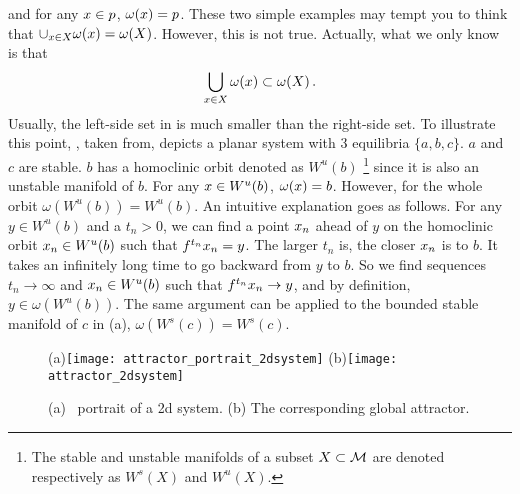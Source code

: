 and for any $x\in p$, $\omega(x) = p$.
These two simple examples may tempt you to
think that $\cup_{x\in X}\omega(x) = \omega(X)$. However, this
is not true. Actually, what we only know is that
\begin{equation}
  \label{eq:omega3}
  \bigcup_{x\in X}\omega(x)\subset \omega(X)
  \,.
\end{equation}
Usually, the left-side set in  is much smaller than
the right-side set. To illustrate this point,
, taken from, depicts a planar system
with 3 equilibria $\{a, b, c\}$. $a$ and $c$ are stable.
$b$ has a homoclinic orbit denoted as $W^u(b)$
\footnote{
  The stable and unstable manifolds of a subset $X\subset \mathcal{M}$ are denoted respectively
  as $W^s(X)$ and $W^u(X)$.
}
since it is
also an unstable manifold of $b$. For any $x\in W^u(b)$,
$\omega(x) = b$. However, for the whole orbit
$\omega(W^u(b)) = W^u(b)$. An intuitive explanation goes as follows.
For any $y\in W^u(b)$ and a $t_n > 0$, we can find a point $x_n$
ahead of $y$ on the homoclinic orbit $x_n\in W^u(b)$
such that ${f^{t_n}}x_n = y$. The larger $t_n$ is, the closer $x_n$ is to $b$.
It takes an infinitely long time to go backward from $y$ to $b$.
So we find sequences $t_n\to \infty$ and $x_n \in W^u(b)$ such that
${f^{t_n}}x_n \to y$, and by definition, $y\in \omega(W^u(b))$.
The same argument can be applied
to the bounded stable manifold of $c$ in (a),
$\omega(W^s(c)) = W^s(c)$.
\begin{figure}[h]
  \centering
  (a)\texttt{[image: attractor\_portrait\_2dsystem]}
  (b)\texttt{[image: attractor\_2dsystem]}
  \caption[The global attractor of a 2d system]{
    (a) \Statesp\ portrait of a 2d system.
    (b) The corresponding global attractor.
  }
  \label{fig:attractor_portrait}
\end{figure}

